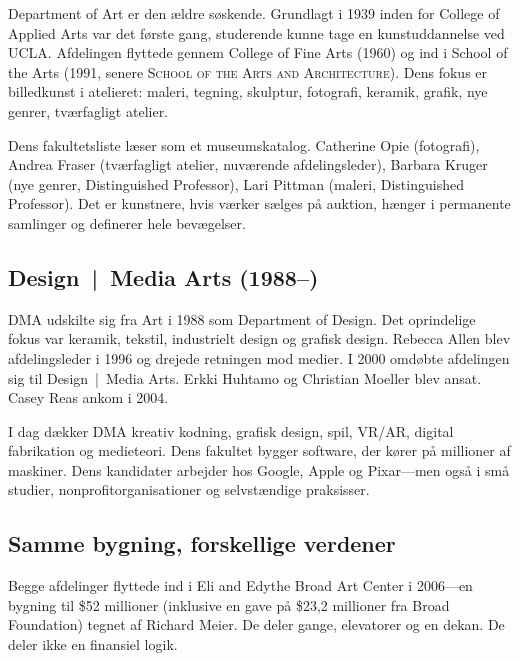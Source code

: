 \documentclass[10pt,letterpaper,twocolumn]{article}
\newcommand{\dma}{\textsc{DMA}}
\newcommand{\sofa}{\textsc{School of the Arts and Architecture}}
\begin{document}
Department of Art er den ældre søskende. Grundlagt i 1939 inden for College of Applied Arts var det første gang, studerende kunne tage en kunstuddannelse ved UCLA. Afdelingen flyttede gennem College of Fine Arts (1960) og ind i School of the Arts (1991, senere \sofa{}). Dens fokus er billedkunst i atelieret: maleri, tegning, skulptur, fotografi, keramik, grafik, nye genrer, tværfagligt atelier.

Dens fakultetsliste læser som et museumskatalog. Catherine Opie (fotografi), Andrea Fraser (tværfagligt atelier, nuværende afdelingsleder), Barbara Kruger (nye genrer, Distinguished Professor), Lari Pittman (maleri, Distinguished Professor). Det er kunstnere, hvis værker sælges på auktion, hænger i permanente samlinger og definerer hele bevægelser.

\subsection{Design~|~Media Arts (1988--)}

\dma{} udskilte sig fra Art i 1988 som Department of Design. Det oprindelige fokus var keramik, tekstil, industrielt design og grafisk design. Rebecca Allen blev afdelingsleder i 1996 og drejede retningen mod medier. I 2000 omdøbte afdelingen sig til Design~|~Media Arts. Erkki Huhtamo og Christian Moeller blev ansat. Casey Reas ankom i 2004.

I dag dækker \dma{} kreativ kodning, grafisk design, spil, VR/AR, digital fabrikation og medieteori. Dens fakultet bygger software, der kører på millioner af maskiner. Dens kandidater arbejder hos Google, Apple og Pixar---men også i små studier, nonprofitorganisationer og selvstændige praksisser.

\subsection{Samme bygning, forskellige verdener}

Begge afdelinger flyttede ind i Eli and Edythe Broad Art Center i 2006---en bygning til \$52 millioner (inklusive en gave på \$23,2 millioner fra Broad Foundation) tegnet af Richard Meier. De deler gange, elevatorer og en dekan. De deler ikke en finansiel logik.
\end{document}
